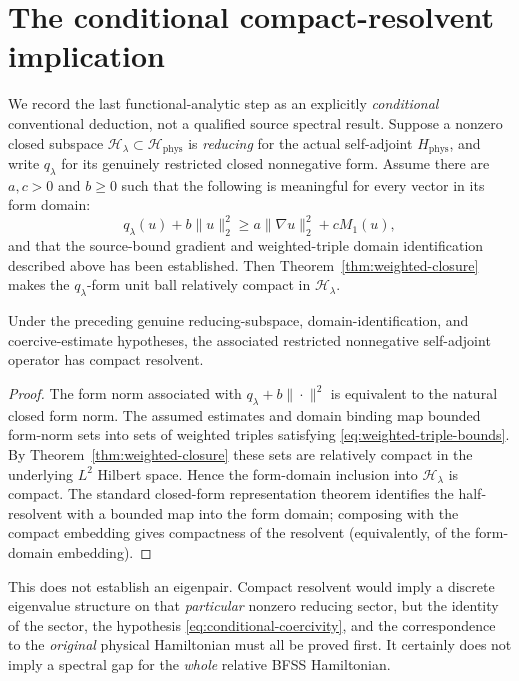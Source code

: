 \section{The conditional compact-resolvent implication}
We record the last functional-analytic step as an explicitly
\emph{conditional} conventional deduction, not a qualified source
spectral result. Suppose a nonzero closed subspace
\(\mathscr H_\lambda\subset\mathscr H_{\mathrm{phys}}\) is
\emph{reducing} for the actual self-adjoint \(H_{\mathrm{phys}}\),
and write \(q_\lambda\) for its genuinely restricted closed
nonnegative form. Assume there are \(a,c>0\) and \(b\ge0\) such
that the following is meaningful for every vector in its form domain:
\begin{equation}\label{eq:conditional-coercivity}
 q_\lambda(u)+b\|u\|_2^2\ge
 a\|\nabla u\|_2^2+cM_1(u),
\end{equation}
and that the source-bound gradient and weighted-triple domain
identification described above has been established. Then
Theorem~\ref{thm:weighted-closure} makes the \(q_\lambda\)-form
unit ball relatively compact in \(\mathscr H_\lambda\).

\begin{proposition}\label{prop:conditional-resolvent}
Under the preceding genuine reducing-subspace, domain-identification,
and coercive-estimate hypotheses, the associated restricted
nonnegative self-adjoint operator has compact resolvent.
\end{proposition}
\begin{proof}
The form norm associated with \(q_\lambda+b\|\cdot\|^2\)
is equivalent to the natural closed form norm. The assumed estimates
and domain binding map bounded form-norm sets into sets of weighted
triples satisfying \eqref{eq:weighted-triple-bounds}. By
Theorem~\ref{thm:weighted-closure} these sets are relatively compact
in the underlying \(L^2\) Hilbert space. Hence the form-domain
inclusion into \(\mathscr H_\lambda\) is compact. The standard
closed-form representation theorem identifies the half-resolvent with
a bounded map into the form domain; composing with the compact
embedding gives compactness of the resolvent (equivalently, of the
form-domain embedding).\end{proof}

This does not establish an eigenpair. Compact resolvent would imply
a discrete eigenvalue structure on that \emph{particular} nonzero
reducing sector, but the identity of the sector, the hypothesis
\eqref{eq:conditional-coercivity}, and the correspondence to the
\emph{original} physical Hamiltonian must all be proved first.
It certainly does not imply a spectral gap for the \emph{whole}
relative BFSS Hamiltonian.


